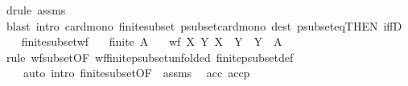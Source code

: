 \begin{isabellebody}
\ {\isacharparenleft}{\kern0pt}drule\ assms{\isacharparenright}{\kern0pt}\isanewline
\ \ \isamarkupfalse%
\ {\isacharparenleft}{\kern0pt}blast\ intro{\isacharcolon}{\kern0pt}\ card{\isacharunderscore}{\kern0pt}mono\ finite{\isacharunderscore}{\kern0pt}subset\ psubset{\isacharunderscore}{\kern0pt}card{\isacharunderscore}{\kern0pt}mono\ dest{\isacharcolon}{\kern0pt}\ psubset{\isacharunderscore}{\kern0pt}eq{\isacharbrackleft}{\kern0pt}THEN\ iffD{}{\isacharbrackright}{\kern0pt}{\isacharparenright}{\kern0pt}\isanewline
\ \ \isamarkupfalse%
%
\endisatagproof
{\isafoldproof}%
%
\isadelimproof
\isanewline
%
\endisadelimproof
\isanewline
{}\isamarkupfalse%
\ finite{\isacharunderscore}{\kern0pt}subset{\isacharunderscore}{\kern0pt}wf{\isacharcolon}{\kern0pt}\isanewline
\ \ \ {\isachardoublequoteopen}finite\ A{\isachardoublequoteclose}\isanewline
\ \ \ {\isachardoublequoteopen}wf\ {\isacharbraceleft}{\kern0pt}{\isacharparenleft}{\kern0pt}X{\isacharcomma}{\kern0pt}\ Y{\isacharparenright}{\kern0pt}{\isachardot}{\kern0pt}\ X\ {\isasymsubset}\ Y\ {\isasymand}\ Y\ {\isasymsubseteq}\ A{\isacharbraceright}{\kern0pt}{\isachardoublequoteclose}\isanewline
%
\isadelimproof
\ \ %
\endisadelimproof
%
\isatagproof
{}\isamarkupfalse%
\ {\isacharparenleft}{\kern0pt}rule\ wf{\isacharunderscore}{\kern0pt}subset{\isacharbrackleft}{\kern0pt}OF\ wf{\isacharunderscore}{\kern0pt}finite{\isacharunderscore}{\kern0pt}psubset{\isacharbrackleft}{\kern0pt}unfolded\ finite{\isacharunderscore}{\kern0pt}psubset{\isacharunderscore}{\kern0pt}def{\isacharbrackright}{\kern0pt}{\isacharbrackright}{\kern0pt}{\isacharparenright}{\kern0pt}\isanewline
\ \ \ \ {\isacharparenleft}{\kern0pt}auto\ intro{\isacharcolon}{\kern0pt}\ finite{\isacharunderscore}{\kern0pt}subset{\isacharbrackleft}{\kern0pt}OF\ {\isacharunderscore}{\kern0pt}\ assms{\isacharbrackright}{\kern0pt}{\isacharparenright}{\kern0pt}%
\endisatagproof
{\isafoldproof}%
%
\isadelimproof
\isanewline
%
\endisadelimproof
\isanewline
{}\isamarkupfalse%
\ {\isacharparenleft}{\kern0pt}\ acc\ accp\isanewline
%
\isadelimtheory
\isanewline
%
\endisadelimtheory
%
\isatagtheory
{}\isamarkupfalse%
%
\endisatagtheory
{\isafoldtheory}%
%
\isadelimtheory
%
\endisadelimtheory
%
\end{isabellebody}%
\endinput
